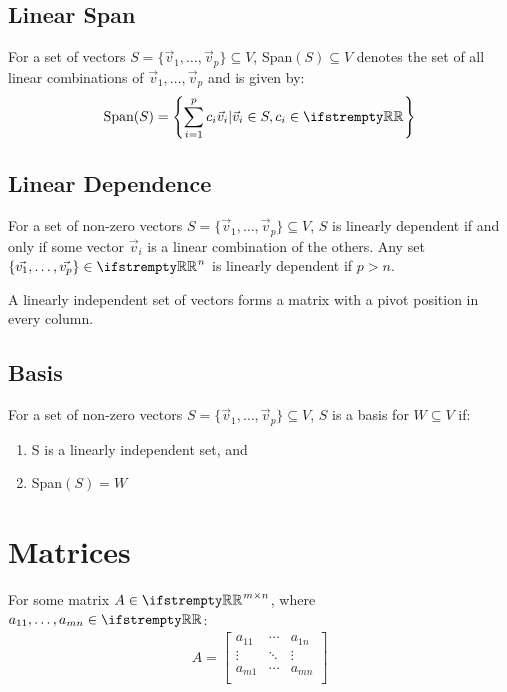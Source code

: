 \documentclass[12pt, a4paper]{article}
\begin{document}
\begin{multicols*}{3}
\subsection{Linear Span}
For a set of vectors $S = \{\vec{v}_1,\ldots,\vec{v}_p\} \subseteq V$, Span$(S) \subseteq V$ denotes the set of all linear combinations of $\vec{v}_1,\ldots,\vec{v}_p$ and is given by:
\begin{align*}   
  \text{Span}(S) = \left\{ \sum^p_{i=1}c_i\vec{v}_i | \vec{v}_i \in S, c_i \in \RR\right\}
\end{align*}

\subsection{Linear Dependence}
For a set of non-zero vectors  $S = \{\vec{v}_1,\ldots,\vec{v}_p\} \subseteq V$, $S$ is linearly dependent if and only if some vector $\vec{v}_i$ is a linear combination of the others. Any set $\{\vec{v_1},\ldots,\vec{v_p}\} \in \RR^n$ is linearly dependent if $p>n$.

A linearly independent set of vectors forms a matrix with a pivot position in every column.

\subsection{Basis}
For a set of non-zero vectors  $S = \{\vec{v}_1,\ldots,\vec{v}_p\} \subseteq V$, $S$ is a basis for $W \subseteq V$ if:
\begin{enumerate}[\roman*.]
  \item S is a linearly independent set, and
  \item Span$(S) = W$
\end{enumerate}

\colbreak

\section{Matrices}
For some matrix $A \in \RR^{m{\times}n}$, where $a_{11},\ldots,a_{mn} \in \RR$:
\begin{align*}
  A = \begin{bmatrix}
    a_{11} & \cdots & a_{1n} \\
    \vdots & \ddots & \vdots \\
    a_{m1} & \cdots & a_{mn} \\
  \end{bmatrix}
\end{align*}


\end{multicols*}
\end{document}
